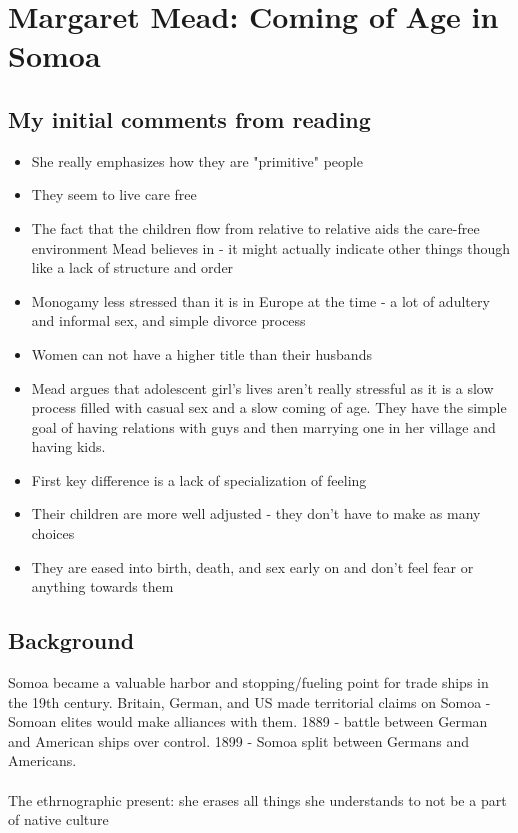 \documentclass{article}
\begin{document}
\section{Margaret Mead: Coming of Age in Somoa}
\subsection{My initial comments from reading}
\begin{itemize}
\item She really emphasizes how they are "primitive" people
\item They seem to live care free
\item The fact that the children flow from relative to relative aids the care-free environment Mead believes in - it might actually indicate other things though like a lack of structure and order
\item Monogamy less stressed than it is in Europe at the time - a lot of adultery and informal sex, and simple divorce process
\item Women can not have a higher title than their husbands
\item Mead argues that adolescent girl's lives aren't really stressful as it is a slow process filled with casual sex and a slow coming of age. They have the simple goal of having relations with guys and then marrying one in her village and having kids.
\item First key difference is a lack of specialization of feeling
\item Their children are more well adjusted - they don't have to make as many choices
\item They are eased into birth, death, and sex early on and don't feel fear or anything towards them
\end{itemize} 

\subsection{Background}
Somoa became a valuable harbor and stopping/fueling point for trade ships in the 19th century. Britain, German, and US made territorial claims on Somoa - Somoan elites would make alliances with them. 1889 - battle between German and American ships over control. 1899 - Somoa split between Germans and Americans. \\ \\ 
The ethrnographic present: she erases all things she understands to not be a part of native culture 
\end{document}
